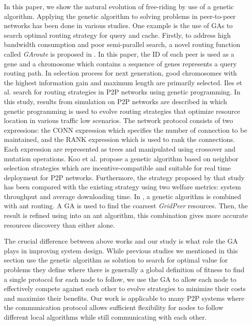\documentclass[12pt,journal,draftcls,letterpaper,onecolumn]{IEEEtran}
\begin{document}
In this paper, we show the natural evolution of free-riding by use of a genetic
algorithm. Applying the genetic algorithm to solving problems in peer-to-peer
networks has been done in various studies. One example
is the use of GAs to search optimal routing strategy for query and cache.
Firstly, to address high bandwidth consumption and poor semi-parallel search, a novel routing
function called \emph{GAroute} is proposed in \cite{conf/www/WongLK05}. In this paper,
the ID of each peer is used as a gene
and a chromosome which contains a sequence of genes represents a query routing path. In
selection process for next generation, good chromosomes with the highest information gain
and maximum length are primarily selected. Iles et al.\cite{Iles02} search for
routing strategies in P2P networks using genetic programming. In this study, results
from simulation on P2P networks are described in which genetic programming is used
to evolve routing strategies that optimize resource location in various traffic low scenarios.
The network protocol consists of two expressions: the CONN expression which
specifies the
number of connection to be maintained, and the RANK expression which is used to rank the
connections. Each expression are represented as trees and manipulated using crossover and
mutation operations.
Koo et al.\cite{journals/fgcs/KooKL06} propose a genetic algorithm based on 
neighbor selection strategies which are
incentive-compatible and suitable for real time deployment for P2P networks.
Furthermore, the strategy proposed by that study has been compared with the existing
strategy using two welfare metrics: system throughput and average downloading time.
In \cite{IIHMSP07}, a genetic algorithm is combined with ant routing.
A GA is used to find the coarsest \emph{GridPeer} resources.  Then, the result
is refined using into an ant algorithm, this combination gives more
accurate resources discovery than either alone.

The crucial difference between above works and our study is what role the GA
plays in improving system design. While previous studies we mentioned in this section use the
genetic algorithm as solution to search for optimal value for problems they
define where there is generally a global definition of fitness to find a
single protocol for each node to follow, we use the GA to allow each node to
effectively compete against each other to evolve strategies to minimize their
costs and maximize their benefits.  Our work is applicable to many P2P systems
where the communication protocol allows sufficient flexibility for nodes to
follow different local algorithms while still communicating with each other.
 
\end{document}
